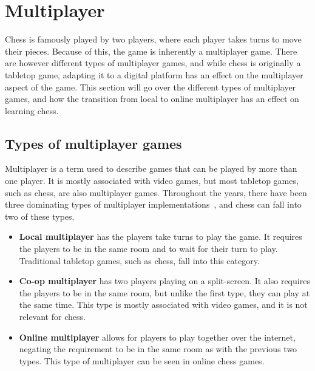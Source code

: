 \section{Multiplayer}\label{sec:multiplayer-analysis}

Chess is famously played by two players, where each player takes turns to move their pieces.
Because of this, the game is inherently a multiplayer game.
There are however different types of multiplayer games, and while chess is originally a tabletop game, adapting it to a
digital platform has an effect on the multiplayer aspect of the game.
This section will go over the different types of multiplayer games, and how the transition from local to online
multiplayer has an effect on learning chess.

\subsection{Types of multiplayer games}\label{subsec:types-of-multiplayer-games}

Multiplayer is a term used to describe games that can be played by more than one player.
It is mostly associated with video games, but most tabletop games, such as chess, are also multiplayer games.
Throughout the years, there have been three dominating types of multiplayer implementations~\cite{multiplayer-types},
and chess can fall into two of these types.

\begin{itemize}

    \item \textbf{Local multiplayer} has the players take turns to play the game.
    It requires the players to be in the same room and to wait for their turn to play.
    Traditional tabletop games, such as chess, fall into this category.

    \item \textbf{Co-op multiplayer} has two players playing on a split-screen.
    It also requires the players to be in the same room, but unlike the first type, they can play at the same time.
    This type is mostly associated with video games, and it is not relevant for chess.

    \item \textbf{Online multiplayer} allows for players to play together over the internet, negating the requirement to
    be in the same room as with the previous two types.
    This type of multiplayer can be seen in online chess games.

\end{itemize}


